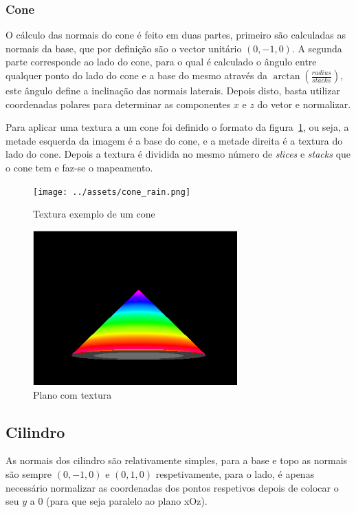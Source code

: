 \documentclass[a4paper]{article}
\begin{document}
\subsubsection{Cone}
O cálculo das normais do cone é feito em duas partes, primeiro são calculadas
as normais da base, que por definição são o vector unitário $(0,-1,0)$. A
segunda parte corresponde ao lado do cone, para o qual é calculado o ângulo
entre qualquer ponto do lado do cone e a base do mesmo através da
$\arctan(\frac{radius}{stacks})$, este ângulo define a
inclinação das normais laterais. Depois disto, basta utilizar coordenadas
polares para determinar as componentes $x$ e $z$ do vetor e normalizar.

Para aplicar uma textura a um cone foi definido o formato da
figura~\ref{fig:conetexture}, ou seja, a metade esquerda da imagem é a base do
cone, e a metade direita é a textura do lado do cone. Depois a textura é
dividida no mesmo número de \textit{slices} e \textit{stacks} que o cone tem e
faz-se o mapeamento.

\begin{figure}[H]
    \centering
    \texttt{[image: ../assets/cone\_rain.png]}
    \caption{Textura exemplo de um cone}\label{fig:conetexture}
\end{figure}

\begin{figure}[H]
    \centering
    \includegraphics[width=0.7\textwidth]{cone.png}
    \caption{Plano com textura}
\end{figure}

\subsection{Cilindro}
As normais dos cilindro são relativamente simples, para a base e topo as
normais são sempre $(0,-1,0)$ e $(0,1,0)$ respetivamente, para o lado, é apenas
necessário normalizar as coordenadas dos pontos respetivos depois de colocar o
seu $y$ a 0 (para que seja paralelo ao plano xOz).
\end{document}
